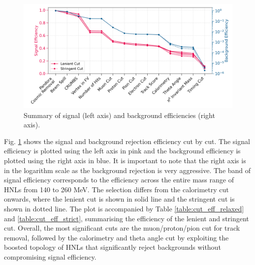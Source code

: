 \begin{figure}[bp!]
    \centering 
    \includegraphics[width=1.0\textwidth]{peff_band}
    \caption[Summary of Selection Efficiency.]{
		Summary of signal (left axis) and background efficiencies (right axis).
	}
        \label{fig:eff}
\end{figure}

Fig. \ref{fig:eff} shows the signal and background rejection efficiency cut by cut.
The signal efficiency is plotted using the left axis in pink and the background efficiency is plotted using the right axis in blue.
It is important to note that the right axis is in the logarithm scale as the background rejection is very aggressive.
The band of signal efficiency corresponds to the efficiency across the entire mass range of HNLs from 140 to 260 MeV. %
The selection differs from the calorimetry cut onwards, where the lenient cut is shown in solid line and the stringent cut is shown in dotted line.
The plot is accompanied by Table \ref{table:cut_eff_relaxed} and \ref{table:cut_eff_strict}, summarising the efficiency of the lenient and stringent cut.
Overall, the most significant cuts are the muon/proton/pion cut for track removal, followed by the calorimetry and theta angle cut by exploiting the boosted topology of HNLs that significantly reject backgrounds without compromising signal efficiency.

